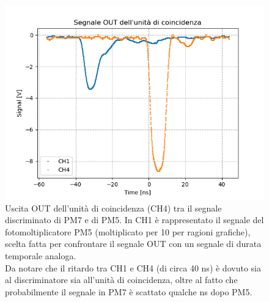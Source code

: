\documentclass{article}
\begin{document}
\begin{figure}[h!]
\begin{center}
\includegraphics[scale=0.6]{Grafici/OUT_segnale.png}
\caption{Uscita OUT dell'unità di coincidenza (CH4) tra il segnale discriminato di PM7 e di PM5. In CH1 è rappresentato il segnale del fotomoltiplicatore PM5 (moltiplicato per 10 per ragioni grafiche), scelta fatta per confrontare il segnale OUT con un segnale di durata temporale analoga. \\Da notare che il ritardo tra CH1 e CH4 (di circa 40 ns) è dovuto sia al discriminatore sia all'unità di coincidenza, oltre al fatto che probabilmente il segnale in PM7 è scattato qualche ns dopo PM5.} \label{OUT}
\end{center}
\end{figure}


\newpage 
\end{document}
